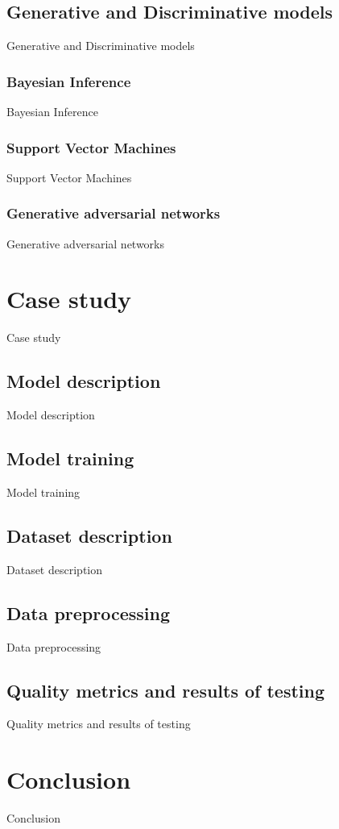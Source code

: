 \documentclass{article}
\theoremstyle{definition}
\begin{document}
\subsection{Generative and Discriminative models}
Generative and Discriminative models

\subsubsection{Bayesian Inference}
Bayesian Inference

\subsubsection{Support Vector Machines}
Support Vector Machines

\subsubsection{Generative adversarial networks}
Generative adversarial networks

\section{Case study}
Case study

\subsection{Model description}
Model description

\subsection{Model training}
Model training

\subsection{Dataset description}
Dataset description

\subsection{Data preprocessing}
Data preprocessing

\subsection{Quality metrics and results of testing}
Quality metrics and results of testing

\section{Conclusion}
Conclusion


\end{document}
